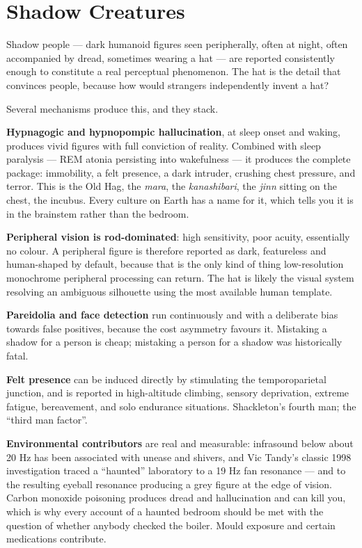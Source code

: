 \section{Shadow Creatures}\label{sec:shadow}

Shadow people --- dark humanoid figures seen peripherally, often at night, often accompanied by
dread, sometimes wearing a hat --- are reported consistently enough to constitute a real
perceptual phenomenon. The hat is the detail that convinces people, because how would strangers
independently invent a hat?

Several mechanisms produce this, and they stack.

\textbf{Hypnagogic and hypnopompic hallucination}, at sleep onset and waking, produces vivid
figures with full conviction of reality. Combined with sleep paralysis --- REM atonia persisting
into wakefulness --- it produces the complete package: immobility, a felt presence, a dark
intruder, crushing chest pressure, and terror. This is the Old Hag, the \emph{mara}, the
\emph{kanashibari}, the \emph{jinn} sitting on the chest, the incubus. Every culture on Earth has
a name for it, which tells you it is in the brainstem rather than the bedroom.

\textbf{Peripheral vision is rod-dominated}: high sensitivity, poor acuity, essentially no
colour. A peripheral figure is therefore reported as dark, featureless and human-shaped by
default, because that is the only kind of thing low-resolution monochrome peripheral processing
can return. The hat is likely the visual system resolving an ambiguous silhouette using the most
available human template.

\textbf{Pareidolia and face detection} run continuously and with a deliberate bias towards false
positives, because the cost asymmetry favours it. Mistaking a shadow for a person is cheap;
mistaking a person for a shadow was historically fatal.

\textbf{Felt presence} can be induced directly by stimulating the temporoparietal junction, and
is reported in high-altitude climbing, sensory deprivation, extreme fatigue, bereavement, and
solo endurance situations. Shackleton's fourth man; the ``third man factor''.

\textbf{Environmental contributors} are real and measurable: infrasound below about 20 Hz has been
associated with unease and shivers, and Vic Tandy's classic 1998 investigation traced a
``haunted'' laboratory to a 19 Hz fan resonance --- and to the resulting eyeball resonance
producing a grey figure at the edge of vision. Carbon monoxide poisoning produces dread and
hallucination and can kill you, which is why every account of a haunted bedroom should be met
with the question of whether anybody checked the boiler. Mould exposure and certain medications
contribute.

